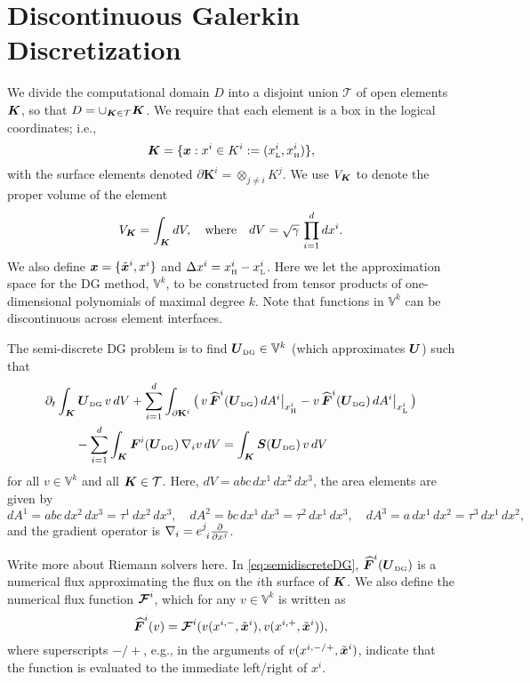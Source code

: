 \documentclass[10pt,preprint]{aastex}
\newcommand{\ee}[1]{{\color{red} #1}}
\newcommand{\dx}{\Delta x}
\newcommand{\pbK}{\partial\mathbf{K}}
\newcommand{\UDG}{\bU_{\mbox{\tiny DG}}}
\newcommand{\sumx}{\sum_{i=1}^{d}}
\begin{document}
\section{Discontinuous Galerkin Discretization}

We divide the computational domain $D$ into a disjoint union $\mathcal{T}$ of open elements $\boldsymbol{K}$, so that $D = \cup_{\boldsymbol{K} \in \mathcal{T}}\boldsymbol{K}$.  
We require that each element is a box in the logical coordinates; i.e.,
\begin{equation}
  \boldsymbol{K}=\{\boldsymbol{x} : x^{i} \in K^{i} := (x_{\mbox{\tiny L}}^{i},x_{\mbox{\tiny H}}^{i})\}, 
\end{equation}
with the surface elements denoted $\pbK^{i}=\otimes_{j\ne i}K^{j}$.  
We use $V_{\boldsymbol{K}}$ to denote the proper volume of the element
\begin{equation}
  V_{\boldsymbol{K}} = \int_{\boldsymbol{K}}dV, \quad\text{where}\quad dV = \sqrt{\gamma}\,\prod_{i=1}^{d}dx^{i}.  
\end{equation}
We also define $\boldsymbol{x}=\{\tilde{\boldsymbol{x}}^{i},x^{i}\}$ and $\dx^{i}=\xH^{i}-\xL^{i}$.  
Here we let the approximation space for the DG method, $\mathbb{V}^{k}$, to be constructed from tensor products of one-dimensional polynomials of maximal degree $k$.  
Note that functions in $\mathbb{V}^{k}$ can be discontinuous across element interfaces. 

The semi-discrete DG problem is to find $\UDG\in\mathbb{V}^{k}$ (which approximates $\boldsymbol{U}$) such that
\begin{align}
  &\partial_{t}\int_{\bK}\UDG\,v\,dV
  +\sumx\int_{\pbK^{i}}\big(\,v\,\widehat{\vect{F}}^{i}(\UDG)\,dA^{i}\big|_{\xH^{i}}-v\,\widehat{\vect{F}}^{i}(\UDG)\,dA^{i}\big|_{\xL^{i}}\,\big) \nonumber \\
  &\hspace{24pt}
  -\sumx\int_{\bK}\vect{F}^{i}(\UDG)\,\nabla_{i}v\,dV
  =\int_{\bK}\vect{S}(\UDG)\,v\,dV
  \label{eq:semidiscreteDG}
\end{align}
for all $v\in\mathbb{V}^{k}$ and all $\boldsymbol{K}\in\mathcal{T}$.  
Here, $dV=abc\,dx^{1}\,dx^{2}\,dx^{3}$, the area elements are given by
\begin{equation}
  dA^{1}=abc\,dx^{2}\,dx^{3}=\tau^{1}\,dx^{2}\,dx^{3}, \quad
  dA^{2}=bc\,dx^{1}\,dx^{3}=\tau^{2}\,dx^{1}\,dx^{3}, \quad
  dA^{3}=a\,dx^{1}\,dx^{2}=\tau^{3}\,dx^{1}\,dx^{2}, 
\end{equation}
and the gradient operator is $\nabla_{i}=e^{j}_{~i}\frac{\partial }{\partial x^{j}}$.  

\ee{Write more about Riemann solvers here.}
In \eqref{eq:semidiscreteDG}, $\vect{\widehat{F}}^{i}(\UDG)$ is a numerical flux approximating the flux on the $i$th surface of $\boldsymbol{K}$.  
We also define the numerical flux function $\boldsymbol{\mathcal{F}}^{i}$, which for any $v\in\mathbb{V}^{k}$ is written as
\begin{equation}
  \boldsymbol{\widehat{F}}^{i}(v)=\boldsymbol{\mathcal{F}}^{i}(v(x^{i,-},\tilde{\boldsymbol{x}}^{i}),v(x^{i,+},\tilde{\boldsymbol{x}}^{i})),
\end{equation}
where superscripts $-/+$, e.g., in the arguments of $v(x^{i,-/+},\tilde{\boldsymbol{x}}^{i})$, indicate that the function is evaluated to the immediate left/right of $x^{i}$.  
\end{document}
